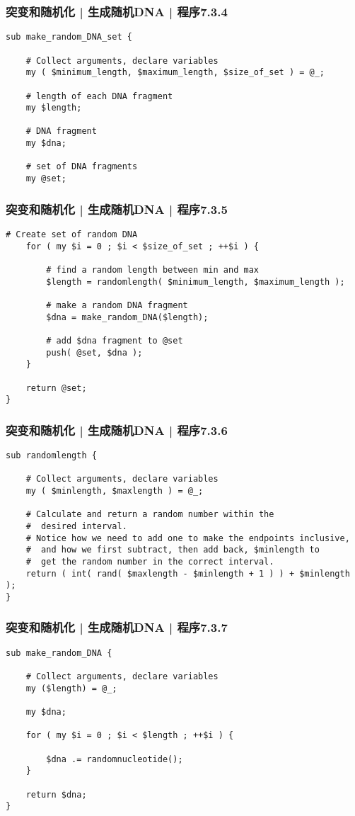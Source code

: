 \begin{frame}[fragile]
  \frametitle{突变和随机化 | 生成随机DNA | 程序7.3.4}
\begin{lstlisting}[firstnumber=51]
sub make_random_DNA_set {

    # Collect arguments, declare variables
    my ( $minimum_length, $maximum_length, $size_of_set ) = @_;

    # length of each DNA fragment
    my $length;

    # DNA fragment
    my $dna;

    # set of DNA fragments
    my @set;
\end{lstlisting}
\end{frame}

\begin{frame}[fragile]
  \frametitle{突变和随机化 | 生成随机DNA | 程序7.3.5}
\begin{lstlisting}[firstnumber=65,basicstyle=\small\tt]
    # Create set of random DNA
    for ( my $i = 0 ; $i < $size_of_set ; ++$i ) {

        # find a random length between min and max
        $length = randomlength( $minimum_length, $maximum_length );

        # make a random DNA fragment
        $dna = make_random_DNA($length);

        # add $dna fragment to @set
        push( @set, $dna );
    }

    return @set;
}
\end{lstlisting}
\end{frame}

\begin{frame}[fragile]
  \frametitle{突变和随机化 | 生成随机DNA | 程序7.3.6}
\begin{lstlisting}[firstnumber=94,basicstyle=\small\tt]
sub randomlength {

    # Collect arguments, declare variables
    my ( $minlength, $maxlength ) = @_;

    # Calculate and return a random number within the
    #  desired interval.
    # Notice how we need to add one to make the endpoints inclusive,
    #  and how we first subtract, then add back, $minlength to
    #  get the random number in the correct interval.
    return ( int( rand( $maxlength - $minlength + 1 ) ) + $minlength );
}
\end{lstlisting}
\end{frame}

\begin{frame}[fragile]
  \frametitle{突变和随机化 | 生成随机DNA | 程序7.3.7}
\begin{lstlisting}[firstnumber=114]
sub make_random_DNA {

    # Collect arguments, declare variables
    my ($length) = @_;

    my $dna;

    for ( my $i = 0 ; $i < $length ; ++$i ) {

        $dna .= randomnucleotide();
    }

    return $dna;
}
\end{lstlisting}
\end{frame}

